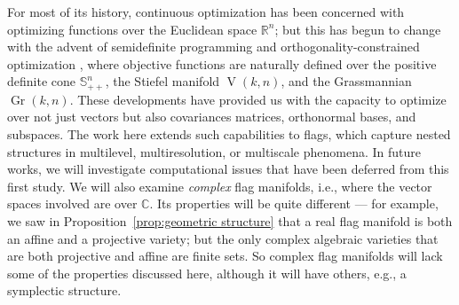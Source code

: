\documentclass[11pt,reqno]{amsart}%
\theoremstyle{definition}
\theoremstyle{remark}
\DeclareMathOperator{\Gr}{Gr}
\DeclareMathOperator{\V}{V}
\newcommand{\pp}{{\plus\plus}}
\begin{document}
For most of its history, continuous optimization has been concerned with optimizing functions over the Euclidean space $\mathbb{R}^n$; but this has begun to change with the advent of semidefinite programming \cite{sdp} and orthogonality-constrained optimization \cite{EAS}, where objective functions are naturally defined over the positive definite cone $\mathbb{S}^n_{\pp}$, the Stiefel manifold $\V(k,n)$, and the Grassmannian $\Gr(k,n)$. These developments have provided us with the capacity to optimize over not just vectors but also covariances matrices, orthonormal bases, and subspaces.  The work here extends such capabilities to flags, which capture nested structures  in multilevel, multiresolution, or multiscale phenomena.
In future works, we will investigate computational issues \cite{next} that have been deferred from this first study. We will also examine \emph{complex} flag manifolds, i.e., where the vector spaces involved are over $\mathbb{C}$. Its properties will be quite different --- for example, we saw in Proposition~\ref{prop:geometric structure} that a real flag manifold is both an affine and a projective variety; but the only complex algebraic varieties that are both projective and affine are finite sets. So complex flag manifolds will lack some of the properties discussed here, although it will have others, e.g., a symplectic structure.
\end{document}
